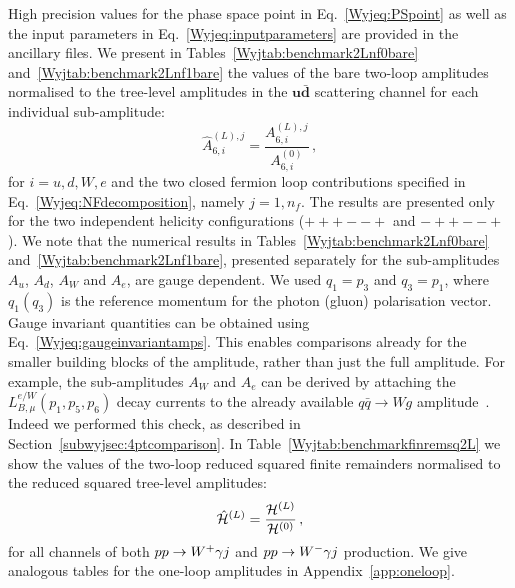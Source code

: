 \documentclass[main.tex]{subfiles}
\begin{document}
High precision values for the phase space point in Eq.~\eqref{Wyjeq:PSpoint} as well as the input parameters in Eq.~\eqref{Wyjeq:inputparameters} are provided in the ancillary files.
We present in Tables~\ref{Wyjtab:benchmark2Lnf0bare} and~\ref{Wyjtab:benchmark2Lnf1bare} the values of the bare two-loop amplitudes
normalised to the tree-level amplitudes in the $\mathbf{u\bar{d}}$ scattering channel for each individual sub-amplitude:
\begin{equation}  \label{Wyjeq:treenorm}
\hat{A}_{6,i}^{(L),j} = \frac{A_{6,i}^{(L),j}}{A_{6,i}^{(0)}} \,, 
\end{equation} 
for $i = u,d,W,e$ and the two closed fermion loop contributions specified in Eq.~\eqref{Wyjeq:NFdecomposition}, namely $j=1,n_f$.
The results are presented only for the two independent helicity configurations ($\scriptstyle +++--+$ and $\scriptstyle -++--+$).
We note that the numerical results in Tables~\ref{Wyjtab:benchmark2Lnf0bare} and~\ref{Wyjtab:benchmark2Lnf1bare}, presented separately for the sub-amplitudes $A_u$, $A_d$, $A_W$ and $A_e$,
are gauge dependent. We used  $q_1 = p_3$ and $q_3 = p_1$, where $q_1 (q_3)$ is the reference momentum for the photon (gluon) polarisation vector. Gauge invariant quantities can be obtained using Eq.~\eqref{Wyjeq:gaugeinvariantamps}. This enables comparisons already for the smaller building blocks of the amplitude, rather than just the full amplitude. For example, the sub-amplitudes $A_W$ and $A_e$ can be derived by attaching the $L^{e/W}_{B,\mu}(p_1,p_5,p_6)$ decay currents to the already available $q\bar{q} \to Wg$ 
amplitude~\cite{Gehrmann:2011ab}. Indeed we performed this check, as described in Section~\ref{subwyjsec:4ptcomparison}. 
In Table~\ref{Wyjtab:benchmarkfinremsq2L} we show the values of the two-loop reduced squared finite remainders normalised to the reduced squared tree-level amplitudes: 
\begin{equation}
\hat{\mathcal{H}}^{(L)} = \frac{\mathcal{H}^{(L)}}{\mathcal{H}^{(0)}} \,,
\end{equation}
for all channels of both $pp \to W^+\gamma j$ and $pp\to W^-\gamma j$ production. We give analogous tables for the one-loop amplitudes in Appendix~\ref{app:oneloop}.
%
\end{document}
